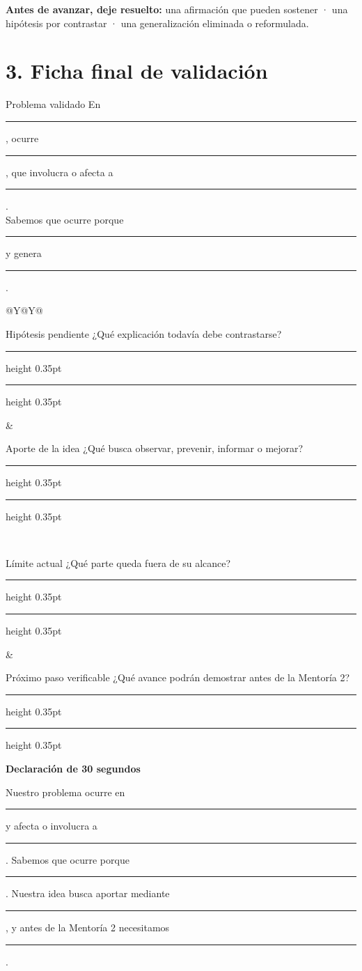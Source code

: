 \documentclass[10pt,a4paper]{article}
\newcommand{\writearea}[1]{\vspace{#1}\hrule height 0.35pt\vspace{4mm}\hrule height 0.35pt}
\begin{document}
\begin{tcolorbox}[colback=AIEPSoft,colframe=AIEPLine,boxrule=0.5pt,arc=1mm,left=3mm,right=3mm,top=2mm,bottom=2mm]
\textbf{Antes de avanzar, deje resuelto:}\quad
una afirmación que pueden sostener · una hipótesis por contrastar · una generalización eliminada o reformulada.
\end{tcolorbox}

\section*{3. Ficha final de validación}
\vspace{-2mm}
\begin{accentfield}[height=33mm]{Problema validado}
En \rule{29mm}{0.35pt}, ocurre \rule{40mm}{0.35pt}, que involucra o afecta a \rule{43mm}{0.35pt}.\\[4mm]
Sabemos que ocurre porque \rule{58mm}{0.35pt} y genera \rule{48mm}{0.35pt}.
\end{accentfield}

\begin{tabularx}{\textwidth}{@{}Y@{\hspace{4mm}}Y@{}}
\begin{fieldbox}[height=28mm]{Hipótesis pendiente}
¿Qué explicación todavía debe contrastarse?
\writearea{4mm}
\end{fieldbox}
&
\begin{fieldbox}[height=28mm]{Aporte de la idea}
¿Qué busca observar, prevenir, informar o mejorar?
\writearea{4mm}
\end{fieldbox}
\\
\begin{fieldbox}[height=28mm]{Límite actual}
¿Qué parte queda fuera de su alcance?
\writearea{4mm}
\end{fieldbox}
&
\begin{fieldbox}[height=28mm]{Próximo paso verificable}
¿Qué avance podrán demostrar antes de la Mentoría 2?
\writearea{4mm}
\end{fieldbox}
\end{tabularx}

\begin{tcolorbox}[colback=AIEPNavy,colframe=AIEPNavy,coltext=white,boxrule=0pt,arc=1mm,left=3mm,right=3mm,top=2.5mm,bottom=2.5mm]
\textbf{Declaración de 30 segundos}\par
Nuestro problema ocurre en \rule{28mm}{0.35pt} y afecta o involucra a \rule{28mm}{0.35pt}. Sabemos que ocurre porque \rule{33mm}{0.35pt}. Nuestra idea busca aportar mediante \rule{34mm}{0.35pt}, y antes de la Mentoría 2 necesitamos \rule{34mm}{0.35pt}.
\end{tcolorbox}
\end{document}
